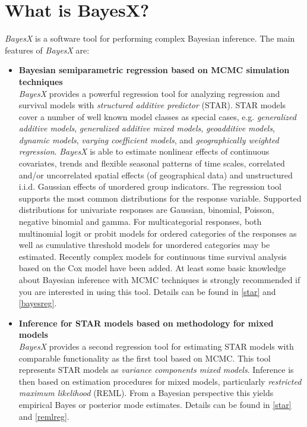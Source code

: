 \chapter{What is BayesX?}

{\em BayesX} is a software tool for performing complex Bayesian
inference. The main features of {\em BayesX} are:
\begin{itemize}
\item {\bf Bayesian semiparametric regression based on MCMC simulation techniques} \\
{\em BayesX} provides a powerful regression tool for analyzing
regression and survival models with {\em structured additive
predictor} (STAR). STAR models cover a number of well known model
classes as special cases, e.g. {\em generalized additive models},
{\em generalized additive mixed models}, {\em geoadditive models},
{\em dynamic models}, {\em varying coefficient models}, and {\em
geographically weighted regression}. {\em BayesX} is able to
estimate nonlinear effects of continuous covariates, trends and
flexible seasonal patterns of time scales, correlated and/or
uncorrelated spatial effects (of geographical data) and
unstructured i.i.d. Gaussian effects of unordered group
indicators. The regression tool  supports the most common
distributions for the response variable. Supported distributions
for univariate responses are Gaussian, binomial, Poisson, negative
binomial and gamma. For multicategorial responses, both
multinomial logit or probit models for ordered categories of the
responses as well as cumulative threshold models for unordered
categories may be estimated. Recently complex models for
continuous time survival analysis based on the Cox model have been
added. At least some basic knowledge about Bayesian inference with
MCMC techniques is strongly recommended if you are interested in
using this tool. Details can be found in \autoref{star} and
\autoref{bayesreg}.
\item {\bf Inference for STAR models based on methodology for mixed models} \\
{\em BayesX} provides a second regression tool for estimating STAR
models with comparable functionality as the first tool based on
MCMC. This tool represents STAR models as {\em variance components
mixed models}. Inference is then based on estimation procedures
for mixed models, particularly {\em restricted maximum likelihood}
(REML). From a Bayesian perspective this yields empirical Bayes or
posterior mode estimates. Details can be found in \autoref{star}
and \autoref{remlreg}.

\end{itemize}
